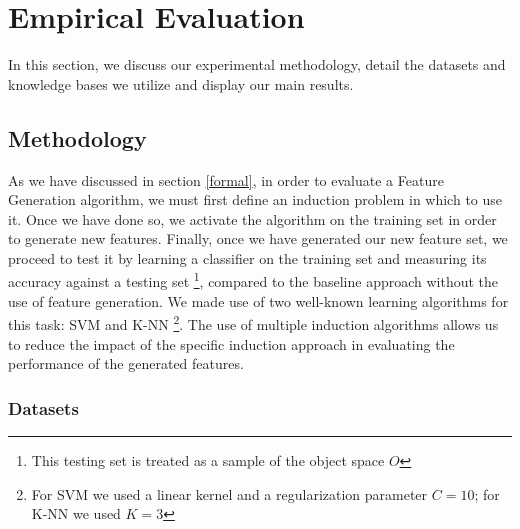 \documentclass[twoside,11pt]{article}
\theoremstyle{definition}
\begin{document}
\section{Empirical Evaluation}
In this section, we discuss our experimental methodology, detail the datasets and knowledge bases we utilize and display our main results.

\subsection{Methodology}

As we have discussed in section \ref{formal}, in order to evaluate a Feature Generation algorithm, we must first define an induction problem in which to use it. Once we have done so, we activate the algorithm on the training set in order to generate new features. Finally, once we have generated our new feature set, we proceed to test it by learning a classifier on the training set and measuring its accuracy against a testing set \footnote{This testing set is treated as a sample of the object space $O$}, compared to the baseline approach without the use of feature generation. We made use of two well-known learning algorithms for this task: SVM \cite{cortes1995support} and K-NN \cite{fix1951discriminatory}\footnote{For SVM we used a linear kernel and a regularization parameter $C=10$; for K-NN we used $K=3$}.
The use of multiple induction algorithms allows us to reduce the impact of the specific induction approach in evaluating the performance of the generated features.

\subsubsection{Datasets}
\end{document}
